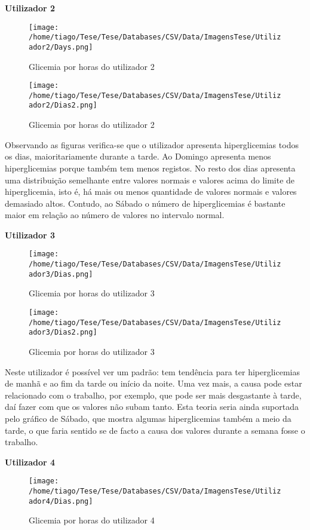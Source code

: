 \textbf{Utilizador 2}

\begin{figure}[H]
\centering
\texttt{[image: /home/tiago/Tese/Tese/Databases/CSV/Data/ImagensTese/Utilizador2/Days.png]}
\caption{Glicemia por horas do utilizador 2}
\end{figure}

\begin{figure}[H]
\centering
\texttt{[image: /home/tiago/Tese/Tese/Databases/CSV/Data/ImagensTese/Utilizador2/Dias2.png]}
\caption{Glicemia por horas do utilizador 2}
\end{figure}

Observando as figuras verifica-se que o utilizador apresenta hiperglicemias todos os dias, maioritariamente durante a tarde. Ao Domingo apresenta menos hiperglicemias porque também tem menos registos. No resto dos dias apresenta uma distribuição semelhante entre valores normais e valores acima do limite de hiperglicemia, isto é, há mais ou menos quantidade de valores normais e valores demasiado altos. Contudo, ao Sábado o número de hiperglicemias é bastante maior em relação ao número de valores no intervalo normal.



\textbf{Utilizador 3}

\begin{figure}[H]
\centering
\texttt{[image: /home/tiago/Tese/Tese/Databases/CSV/Data/ImagensTese/Utilizador3/Dias.png]}
\caption{Glicemia por horas do utilizador 3}
\end{figure}

\begin{figure}[H]
\centering
\texttt{[image: /home/tiago/Tese/Tese/Databases/CSV/Data/ImagensTese/Utilizador3/Dias2.png]}
\caption{Glicemia por horas do utilizador 3}
\end{figure}


Neste utilizador é possível ver um padrão: tem tendência para ter hiperglicemias de manhã e ao fim da tarde ou início da noite. Uma vez mais, a causa pode estar relacionado com o trabalho, por exemplo, que pode ser mais desgastante à tarde, daí fazer com que os valores não subam tanto. Esta teoria seria ainda suportada pelo gráfico de Sábado, que mostra algumas hiperglicemias também a meio da tarde, o que faria sentido se de facto a causa dos valores durante a semana fosse o trabalho. 

\textbf{Utilizador 4}

\begin{figure}[H]
\centering
\texttt{[image: /home/tiago/Tese/Tese/Databases/CSV/Data/ImagensTese/Utilizador4/Dias.png]}
\caption{Glicemia por horas do utilizador 4}
\end{figure}

